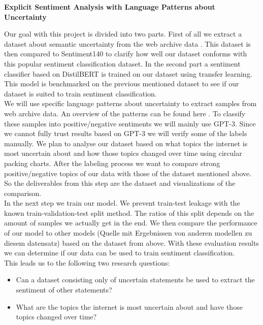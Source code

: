 \documentclass[a4paper,12pt,numbers=enddot]{scrartcl}
\begin{document}
\singlespacing

\begin{Large}
\begin{center}
\textbf{Explicit Sentiment Analysis with Language Patterns about Uncertainty}
\end{center}
\end{Large}

Our goal with this project is divided into two parts. First of all we extract a dataset about semantic uncertainty from the web archive data \citep{Kiesel2018}. This dataset is then compared to Sentiment140 \citep{Sent140} to clarify how well our dataset conforms with this popular sentiment classification dataset. In the second part a sentiment classifier based on DistilBERT \citep{DistilBert} is trained on our dataset using transfer learning. This model is benchmarked on the previous mentioned dataset to see if our dataset is suited to train sentiment classification. 
\\

We will use specific language patterns about uncertainty to extract samples from web archive data. An overview of the patterns can be found here \citep[p. 43]{vincze2014uncertainty}. To classify these samples into positive/negative sentiments we will mainly use GPT-3. Since we cannot fully trust results based on GPT-3 we will verify some of the labels manually. We plan to analyse our dataset based on what topics the internet is most uncertain about and how those topics changed over time using circular packing charts. After the labeling process we want to compare strong positive/negative topics of our data with those of the dataset mentioned above. So the deliverables from this step are the dataset and visualizations of the comparison.
\\

In the next step we train our model. We prevent train-test leakage with the known train-validation-test split method. The ratios of this split depends on the amount of samples we actually get in the end. We then compare the performance of our model to other models (Quelle mit Ergebnissen von anderen modellen zu diesem datensatz) based on the dataset from above. With these evaluation results we can determine if our data can be used to train sentiment classification.
\\

This leads us to the following two research questions:
\begin{itemize}
	\setlength\itemsep{-5pt}
	\item Can a dataset consisting only of uncertain statements be used to extract the sentiment of other statements?
	\item What are the topics the internet is most uncertain about and have those topics changed over time?
\end{itemize}
\end{document}
